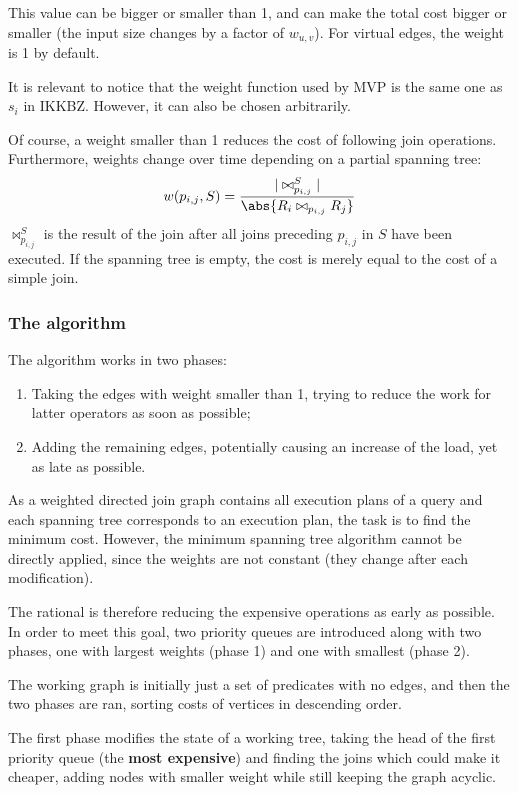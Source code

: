 This value can be bigger or smaller than 1, and can make the total cost bigger or smaller (the input size changes by a factor of $w_{u, v}$). For virtual edges, the weight is 1 by default. 

It is relevant to notice that the weight function used by MVP is the same one as $s_i$ in IKKBZ. However, it can also be chosen arbitrarily.

Of course, a weight smaller than 1 reduces the cost of following join operations. Furthermore, weights change over time depending on a partial spanning tree: 
$$w(p_{i, j}, S) = \frac{|\bowtie_{p_{i, j}}^S|}{\abs{R_i \bowtie_{p_{i, j}} R_j}}$$
$\bowtie_{p_{i, j}}^S$ is the result of the join after all joins preceding $p_{i, j}$ in $S$ have been executed. If the spanning tree is empty, the cost is merely equal to the cost of a simple join. 

\subsubsection{The algorithm}
The algorithm works in two phases:
\begin{enumerate}
	\item Taking the edges with weight smaller than 1, trying to reduce the work for latter operators as soon as possible;
	\item Adding the remaining edges, potentially causing an increase of the load, yet as late as possible.
\end{enumerate}
As a weighted directed join graph contains all execution plans of a query and each spanning tree corresponds to an execution plan, the task is to find the minimum cost. However, the minimum spanning tree algorithm cannot be directly applied, since the weights are not constant (they change after each modification). 

The rational is therefore reducing the expensive operations as early as possible. In order to meet this goal, two priority queues are introduced along with two phases, one with largest weights (phase 1) and one with smallest (phase 2). 

The working graph is initially just a set of predicates with no edges, and then the two phases are ran, sorting costs of vertices in descending order.

The first phase modifies the state of a working tree, taking the head of the first priority queue (the \textbf{most expensive}) and finding the joins which could make it cheaper, adding nodes with smaller weight while still keeping the graph acyclic. 

